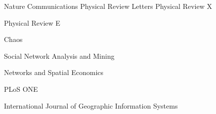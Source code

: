 
\begin{cvhonors}
    \cvhonor
        {} %
        {Nature Communications} %
        {} %
        {} %
    \cvhonor
        {} %
        {Physical Review Letters} %
        {} %
        {} %
    \cvhonor
        {} %
        {Physical Review X} %
        {} %
        {} %
    
    \cvhonor
        {} %
        {Physical Review E} %
        {} %
        {} %

    \cvhonor
        {} %
        {Chaos} %
        {} %
        {} %

    \cvhonor
        {} %
        {Social Network Analysis and Mining} %
        {} %
        {} %
        
    \cvhonor
        {} %
        {Networks and Spatial Economics} %
        {} %
        {} %
        
    \cvhonor
        {} %
        {PLoS ONE} %
        {} %
        {} %

    \cvhonor
        {} %
        {International Journal of Geographic Information Systems} %
        {} %
        {} %
\end{cvhonors}

